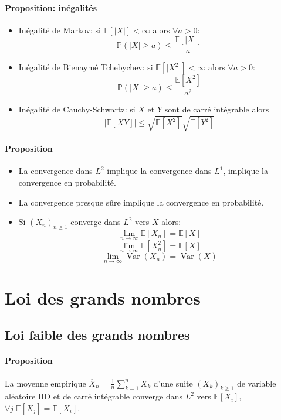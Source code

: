 \documentclass[a4paper,10pt,french,openany]{memoir}
\newcommand{\Proba}{\mathbb{P}}
\newcommand{\Esper}{\mathbb{E}}
\newcommand{\abs}[1]{\lvert #1 \rvert}
\DeclareMathOperator{\Var}{Var}
\begin{document}
\paragraph{Proposition: inégalités}
\begin{itemize}
 \item Inégalité de Markov: si $\Esper[\abs{X}]<\infty$ alors $\forall a > 0$:
 \[\Proba(\abs{X}\geq a) \leq \frac{\Esper[\abs{X}]}a\]
 
 \item Inégalité de Bienaymé Tchebychev: si $\Esper[\abs{X^2}]<\infty$ alors $\forall a > 0$:
 \[\Proba(\abs{X}\geq a) \leq \frac{\Esper[X^2]}{a^2}\]
 
 \item Inégalité de Cauchy-Schwartz: si $X$ et $Y$ sont de carré intégrable alors \[\abs{\Esper[XY]}\leq\sqrt{\Esper[X^2]} \sqrt{\Esper[Y^2]}\]
\end{itemize}

\paragraph{Proposition}
\begin{itemize}
 \item La convergence dans $L^2$ implique la convergence dans $L^1$, implique la convergence en probabilité.
 
 \item La convergence presque sûre implique la convergence en probabilité.
 
 \item Si $(X_n)_{n\geq1}$ converge dans $L^2$ vers $X$ alors: \[\lim_{n\to\infty} \Esper[X_n] = \Esper[X]\] \[\lim_{n\to\infty}\Esper[X_n^2] = \Esper[X]\] \[\lim_{n\to\infty} \Var(X_n) = \Var(X)\]
\end{itemize}

\section{Loi des grands nombres}

\subsection{Loi faible des grands nombres}

\paragraph{Proposition}
La moyenne empirique $\overline X_n = \frac 1 n \sum_{k=1}^n X_k$ d'une suite $(X_k)_{k \geq 1}$ de variable aléatoire IID et de carré intégrable converge dans $L^2$ vers $\Esper[X_i]$, $\forall j \; \Esper[X_j] = \Esper[X_i]$.
\end{document}
